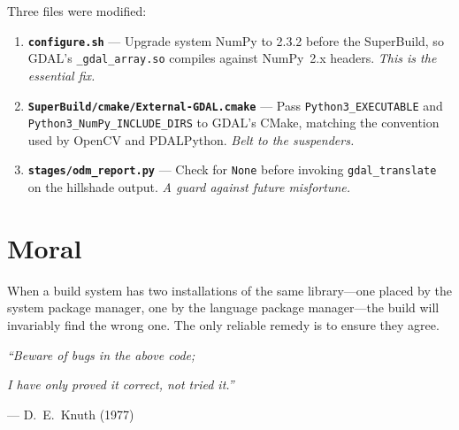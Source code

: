\documentclass{article}
\begin{document}
Three files were modified:

\begin{enumerate}
  \item \textbf{\texttt{configure.sh}} --- Upgrade system NumPy to 2.3.2
    before the SuperBuild, so GDAL's \texttt{\_gdal\_array.so} compiles
    against NumPy~2.x headers.  \emph{This is the essential fix.}

  \item \textbf{\texttt{SuperBuild/cmake/External-GDAL.cmake}} --- Pass
    \texttt{Python3\_EXECUTABLE} and
    \texttt{Python3\_NumPy\_INCLUDE\_DIRS} to GDAL's CMake, matching the
    convention used by OpenCV and PDALPython.  \emph{Belt to the
    suspenders.}

  \item \textbf{\texttt{stages/odm\_report.py}} --- Check for
    \texttt{None} before invoking \texttt{gdal\_translate} on the
    hillshade output.  \emph{A guard against future misfortune.}
\end{enumerate}

\section{Moral}

When a build system has two installations of the same library---one
placed by the system package manager, one by the language package
manager---the build will invariably find the wrong one.  The only
reliable remedy is to ensure they agree.

\bigskip
\hfill\textit{``Beware of bugs in the above code;}

\hfill\textit{I have only proved it correct, not tried it.''}

\hfill--- D.~E.~Knuth (1977)
\end{document}
